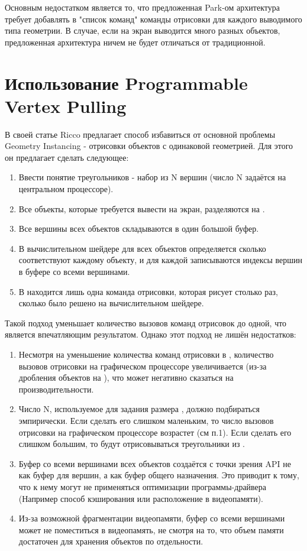 	Основным недостатком является то, что предложенная Park-ом\cite{park2009fast} архитектура требует добавлять в "список команд" команды отрисовки для каждого выводимого типа геометрии. В случае, если на экран выводится много разных объектов, предложенная архитектура ничем не будет отличаться от традиционной.
	
\section{Использование Programmable Vertex Pulling}\label{ch2:Programmable-Vertex-Pulling} %
	В своей статье Ricco\cite{riccio2013introducing} предлагает способ избавиться от основной проблемы Geometry Instancing - отрисовки объектов с одинаковой геометрией. Для этого он предлагает сделать следующее:
	\begin{enumerate}[1.]
		\item Ввести понятие  треугольников - набор из N вершин (число N задаётся на центральном процессоре).
		\item Все объекты, которые требуется вывести на экран, разделяются на .
		\item Все вершины всех объектов складываются в один большой буфер.\label{vertex_big_buffer}
		\item В вычислительном шейдере для всех объектов определяется сколько  соответствуют каждому объекту, и для каждой  записываются индексы вершин в буфере со всеми вершинами. 
		\item В  находится лишь одна команда отрисовки, которая рисует  столько раз, сколько было решено на вычислительном шейдере.
	\end{enumerate}
	
	Такой подход уменьшает количество вызовов команд отрисовок до одной, что является впечатляющим результатом. Однако этот подход не лишён недостатков:
	\begin{enumerate}[1.]
		\item Несмотря на уменьшение количества команд отрисовки в , количество вызовов отрисовки на графическом процессоре увеличивается (из-за дробления объектов на ), что может негативно сказаться на производительности. 
		\item Число N, используемое для задания размера , должно подбираться эмпирически. Если сделать его слишком маленьким, то число вызовов отрисовки на графическом процессоре возрастет (см п.1). Если сделать его слишком большим, то будут отрисовываться  треугольники из .
		\item Буфер со всеми вершинами всех объектов создаётся с точки зрения API не как буфер для вершин, а как буфер общего назначения. Это приводит к тому, что к нему могут не применяться оптимизации программы-драйвера (Например способ кэширования или расположение в видеопамяти).
		\item Из-за возможной фрагментации видеопамяти, буфер со всеми вершинами может не поместиться в видеопамять, не смотря на то, что объем памяти достаточен для хранения объектов по отдельности.
	\end{enumerate}
		
